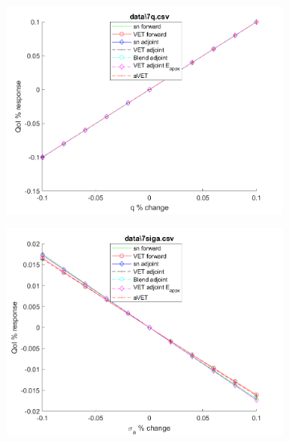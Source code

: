 \documentclass[12pt]{report}
\begin{document}
\begin{figure}[H]
\label{Trial4}
\centering
\begin{subfigure}{.5\textwidth}
  \centering
  \includegraphics[width=.98\linewidth]{figures2/7qSens.png}
\end{subfigure}%
\begin{subfigure}{.5\textwidth}
  \centering
  \includegraphics[width=.98\linewidth]{figures2/7sigaSens.png}
\end{subfigure}
%
\begin{subfigure}{.5\textwidth}
  \centering

\end{subfigure}
\end{figure}
\end{document}
